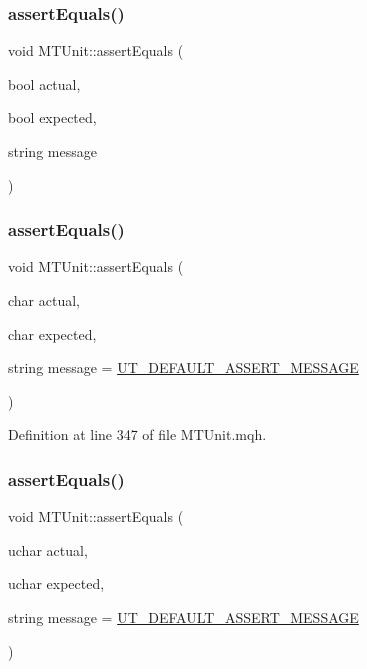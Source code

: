 \subsubsection{\texorpdfstring{assert\+Equals()}{assertEquals()}\hspace{0.1cm}{\footnotesize\ttfamily [1/28]}}
{\footnotesize\ttfamily void M\+T\+Unit\+::assert\+Equals (\begin{DoxyParamCaption}\item[{bool}]{actual,  }\item[{bool}]{expected,  }\item[{string}]{message }\end{DoxyParamCaption})}

\mbox{\label{class_m_t_unit_ad8b22a51b60e31da794e4a7f068b2d18}} 
\subsubsection{\texorpdfstring{assert\+Equals()}{assertEquals()}\hspace{0.1cm}{\footnotesize\ttfamily [2/28]}}
{\footnotesize\ttfamily void M\+T\+Unit\+::assert\+Equals (\begin{DoxyParamCaption}\item[{char}]{actual,  }\item[{char}]{expected,  }\item[{string}]{message = {\ttfamily \mbox{\hyperlink{_m_t_unit_8mqh_a96f5d62188d09039ebc3f443c9120e39}{U\+T\+\_\+\+D\+E\+F\+A\+U\+L\+T\+\_\+\+A\+S\+S\+E\+R\+T\+\_\+\+M\+E\+S\+S\+A\+GE}}} }\end{DoxyParamCaption})}



Definition at line 347 of file M\+T\+Unit.\+mqh.

\mbox{\label{class_m_t_unit_a4f900d0dc6bb257fd79985769d97878c}} 
\subsubsection{\texorpdfstring{assert\+Equals()}{assertEquals()}\hspace{0.1cm}{\footnotesize\ttfamily [3/28]}}
{\footnotesize\ttfamily void M\+T\+Unit\+::assert\+Equals (\begin{DoxyParamCaption}\item[{uchar}]{actual,  }\item[{uchar}]{expected,  }\item[{string}]{message = {\ttfamily \mbox{\hyperlink{_m_t_unit_8mqh_a96f5d62188d09039ebc3f443c9120e39}{U\+T\+\_\+\+D\+E\+F\+A\+U\+L\+T\+\_\+\+A\+S\+S\+E\+R\+T\+\_\+\+M\+E\+S\+S\+A\+GE}}} }\end{DoxyParamCaption})}



